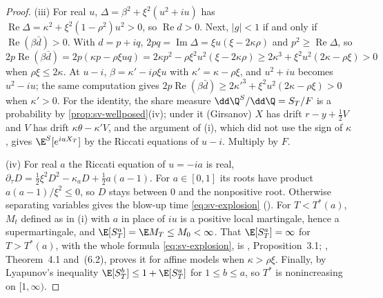 \begin{proof}
(iii) For real $u$, $\Delta=\beta^2+\xi^2(u^2+iu)$ has $\operatorname{Re}\Delta=\kappa^2+\xi^2(1-\rho^2)u^2>0$, so
$\operatorname{Re}d>0$. Next, $|g|<1$ if and only if $\operatorname{Re}(\beta\bar d)>0$. With $d=p+iq$,
$2pq=\operatorname{Im}\Delta=\xi u(\xi-2\kappa\rho)$ and $p^2\ge\operatorname{Re}\Delta$, so
\[
  2p\operatorname{Re}(\beta\bar d)=2p(\kappa p-\rho\xi uq)=2\kappa p^2-\rho\xi^2u^2(\xi-2\kappa\rho)
  \ge2\kappa^3+\xi^2u^2(2\kappa-\rho\xi)>0
\]
when $\rho\xi\le2\kappa$. At $u-i$, $\beta=\kappa'-i\rho\xi u$ with $\kappa'=\kappa-\rho\xi$, and $u^2+iu$ becomes $u^2-iu$;
the same computation gives $2p\operatorname{Re}(\beta\bar d)\ge2\kappa'^3+\xi^2u^2(2\kappa-\rho\xi)>0$ when $\kappa'>0$.
For the identity, the share measure $\dd\Q^S/\dd\Q=S_T/F$ is a probability by \cref{prop:sv-wellposed}(iv);
under it (Girsanov) $X$ has drift $r-y+\frac12V$ and $V$ has drift $\kappa\theta-\kappa'V$, and the argument of (i), which did not use the sign of $\kappa$, gives
$\E^S[e^{iuX_T}]$ by the Riccati equations of $u-i$. Multiply by $F$.

(iv) For real $a$ the Riccati equation of $u=-ia$ is real,
$\partial_\tau D=\frac12\xi^2D^2-\kappa_aD+\frac12a(a-1)$. For $a\in[0,1]$ its roots have product
$a(a-1)/\xi^2\le0$, so $D$ stays between $0$ and the nonpositive root. Otherwise separating variables gives the
blow-up time \eqref{eq:sv-explosion} (). For $T<T^*(a)$, $M_t$ defined as in (i) with
$a$ in place of $iu$ is a positive local martingale, hence a supermartingale, and
$\E[S_T^a]=\E M_T\le M_0<\infty$. That $\E[S_T^a]=\infty$ for $T>T^*(a)$, with the whole formula
\eqref{eq:sv-explosion}, is \textcite{andersen-piterbarg}, Proposition~3.1; \textcite{keller-ressel-2011},
Theorem~4.1 and~(6.2), proves it for affine models when $\kappa>\rho\xi$. Finally, by Lyapunov's
inequality $\E[S_T^b]\le1+\E[S_T^a]$ for $1\le b\le a$, so $T^*$ is nonincreasing on $[1,\infty)$.
\end{proof}

